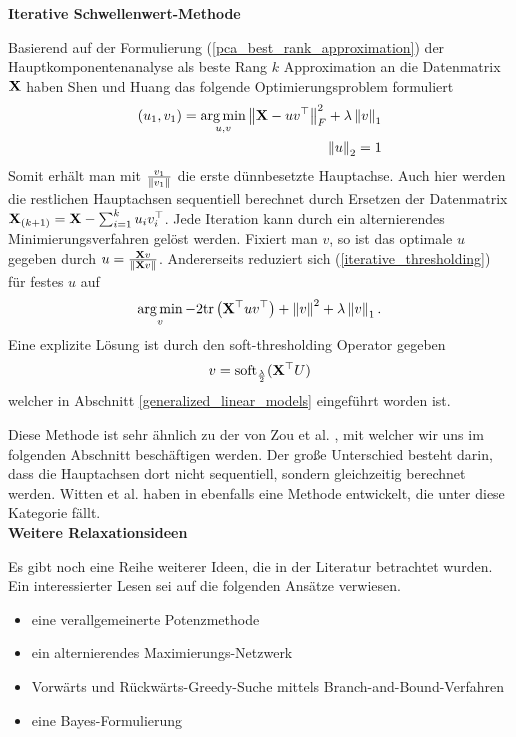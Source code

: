 \textbf{Iterative Schwellenwert-Methode}

Basierend auf der Formulierung (\ref{pca_best_rank_approximation}) der Hauptkomponentenanalyse als beste Rang $k$ Approximation an die Datenmatrix $\mathbf{X}$ haben Shen und Huang \cite{shen} das folgende Optimierungsproblem formuliert
\begin{align}
\label{iterative_thresholding}
\begin{split}
(u_1, v_1) = \operatorname*{arg\,min}_{u, v} \left\lVert \mathbf{X} - u v^{\top} \right\rVert_{F}^{2}  + \lambda \left\lVert v \right\rVert_{1}\\
\left\lVert u \right\rVert_2 = 1
\end{split}
\end{align}
Somit erhält man mit $\frac{v_1}{\left\lVert v_1 \right\rVert}$ die erste dünnbesetzte Hauptachse. Auch hier werden die restlichen Hauptachsen sequentiell berechnet durch Ersetzen der Datenmatrix $\mathbf{X}_{(k+1)} = \mathbf{X} - \sum_{i=1}^k u_iv_i^{\top}$. Jede Iteration kann durch ein alternierendes Minimierungsverfahren gelöst werden. Fixiert man $v$, so ist das optimale $u$ gegeben durch $u = \frac{\mathbf{X}v}{\left\lVert \mathbf{X}v \right\rVert}$. Andererseits reduziert sich (\ref{iterative_thresholding}) für festes $u$ auf
$$\operatorname*{arg\,min}_{v} -2\text{tr} \left( \mathbf{X}^{\top}uv^{\top} \right) + \left\lVert v \right\rVert^{2} + \lambda \left\lVert v \right\rVert_1.$$
Eine explizite Lösung ist durch den soft-thresholding Operator gegeben
$$v = \operatorname{soft}_{\frac{\lambda}{2}}(\mathbf{X}^{\top} U)$$
welcher in Abschnitt \ref{generalized_linear_models} eingeführt worden ist.

Diese Methode ist sehr ähnlich zu der von Zou et al. \cite{zou_sparsepca} , mit welcher wir uns im folgenden Abschnitt beschäftigen werden. Der große Unterschied besteht darin, dass die Hauptachsen dort nicht sequentiell, sondern gleichzeitig berechnet werden. Witten et al. haben in \cite{witten} ebenfalls eine Methode entwickelt, die unter diese Kategorie fällt.\\

\textbf{Weitere Relaxationsideen}

Es gibt noch eine Reihe weiterer Ideen, die in der Literatur betrachtet wurden. Ein interessierter Lesen sei auf die folgenden Ansätze verwiesen.
\begin{itemize}
\item eine verallgemeinerte Potenzmethode \cite{journee}
\item ein alternierendes Maximierungs-Netzwerk \cite{richtarik}
\item Vorwärts und Rückwärts-Greedy-Suche mittels Branch-and-Bound-Verfahren \cite{moghaddam}
\item eine Bayes-Formulierung \cite{guan}
\end{itemize}



